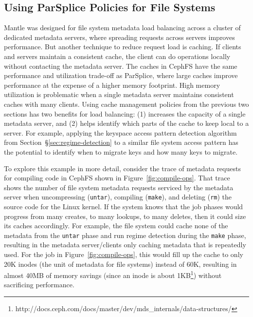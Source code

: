 \subsection{Using ParSplice Policies for File Systems}


Mantle was designed for file system metadata load balancing across a cluster of
dedicated metadata servers, where spreading requests across servers improves
performance. But another technique to reduce request load is caching. If
clients and servers maintain a consistent cache, the client can do operations
locally without contacting the metadata server.  The caches in CephFS have the
same performance and utilization trade-off as ParSplice, where large caches
improve performance at the expense of a higher memory footprint. High memory
utilization is problematic when a single metadata server maintains consistent
caches with many clients.  Using cache management policies from the previous
two sections has two benefits for load balancing: (1) increases the capacity of
a single metadata server, and (2) helps identify which parts of the cache to
keep local to a server. For example, applying the keyspace access pattern
detection algorithm from Section~\S\ref{sec:regime-detection} to a similar file
system access pattern has the potential to identify when to migrate keys and
how many keys to migrate.

To explore this example in more detail, consider the trace of metadata requests
for compiling code in CephFS shown in Figure~\ref{fig:compile-ops}.  That trace
shows the number of file system metadata requests serviced by the metadata
server when uncompressing (\texttt{untar}), compiling (\texttt{make}), and
deleting (\texttt{rm}) the source code for the Linux kernel. If the system
knows that the job phases would progress from many creates, to many lookups, to
many deletes, then it could size its caches accordingly. For example, the file
system could cache none of the metadata from the \texttt{untar} phase and run
regime detection during the \texttt{make} phase, resulting in the metadata
server/clients only caching metadata that is repeatedly used. For the job in
Figure~\ref{fig:compile-ops}, this would fill up the cache to only 20K inodes
(the unit of metadata for file systems) instead of 60K, resulting in almost
40MB of memory savings (since an inode is about
1KB\footnote{http://docs.ceph.com/docs/master/dev/mds\_internals/data-structures/})
without sacrificing performance.

